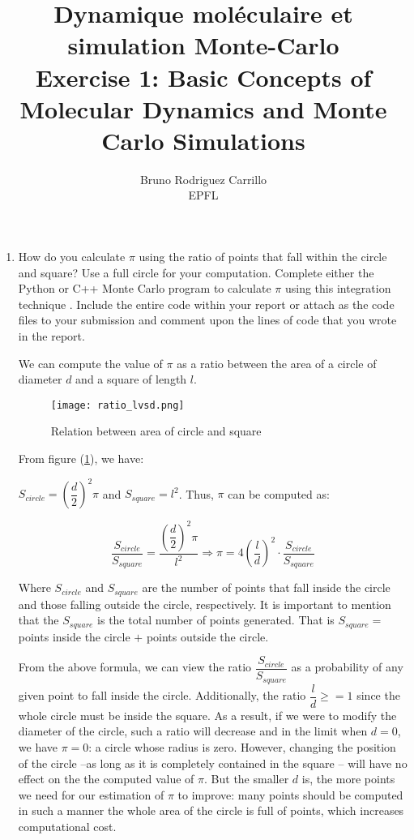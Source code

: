 \documentclass[12pt,letterpaper]{report}
\title{ Dynamique moléculaire et simulation Monte-Carlo \\ Exercise 1: Basic Concepts of Molecular Dynamics and Monte Carlo Simulations}
\author{Bruno Rodriguez Carrillo \\ EPFL}
\begin{document}
	
	\maketitle
	
	\begin{enumerate}
		\item 
		How do you calculate $\pi$ using the ratio of points that fall within the circle and square? Use a full circle for your computation.
		Complete either the Python or C++  Monte Carlo program to calculate $\pi$ using this integration technique . Include the entire code within your report or attach as the code files to your submission and comment upon the lines of code that you wrote in the report.
		
		We can compute the value of $\pi$ as a ratio between the area of a circle of diameter $d$ and a square of length $l$. 
		
		\begin{figure}[H]
			\centering
			\texttt{[image: ratio\_lvsd.png]}	
			\caption{Relation between area of circle and square}
			\label{fig::areas}
		\end{figure}
		
		From figure (\ref{fig::areas}), we have: 
		
		$ S_{circle} = \left( \dfrac{d}{2} \right)^{2} \pi$ and $ S_{square} = l^{2}$. Thus, $\pi$ can be computed as: 
		
		\begin{equation}
			\dfrac{S_{circle}}{S_{square}} = \dfrac{ \left( \dfrac{d}{2} \right)^{2} \pi}{ l^{2} }  \Rightarrow \pi 
			= 4 \left( \dfrac{l}{d} \right)^{2} \cdot \dfrac{S_{circle}}{S_{square}}
			\label{eq::pi_formular}
		\end{equation}
		
		Where  $S_{circle}$ and $S_{square}$ are the number of points that fall inside the circle and those falling outside the circle, respectively. It is important to mention that the $S_{square}$ is the total number of points generated. That is $S_{square}=$ points inside the circle $+$ points outside the circle.
		
		From the above formula, we can view the ratio $\dfrac{S_{circle}}{S_{square}}$ as a probability of any given point to fall inside the circle. Additionally, the ratio $\dfrac{l}{d} \geq = 1$ since the whole circle must be inside the square. As a result, if we were to modify the diameter of the circle, such a ratio will decrease and in the limit when $d = 0$, we have $\pi=0$: a circle whose radius is zero.
		However, changing the position of the circle –as long as it is completely contained in the square – will have no effect on the the computed value of $\pi$. But the smaller $d$ is, the more points we need for our estimation of $\pi$ to improve: many points should be computed in such a manner the whole area of the circle is full of points, which increases computational cost.
		

\end{enumerate}
\end{document}
